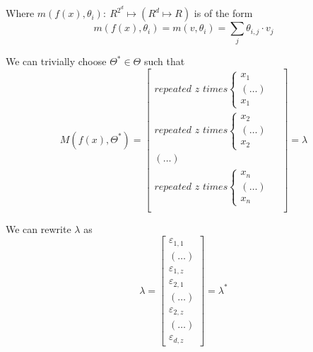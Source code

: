 \documentclass[11pt]{article}
\theoremstyle{definition}
\theoremstyle{definition}
\begin{document}
Where $m(f(x), \theta_i): \ R^{2^d} \mapsto (R^d \mapsto R)$ is of the form
\begin{equation}
    m(f(x), \theta_i)
    = 
    m(v, \theta_i)
    =
    \sum_j \theta_{i,j} \cdot v_j
\end{equation}

We can trivially choose $\Theta^* \in \Theta$ such that 
\begin{equation}
    M(f(x), \Theta^*)
    = 
    \begin{bmatrix}
        \textit{repeated $z$ times} 
        \begin{cases}
            x_1 &  \\
            (\dots) & \\
            x_1 & 
        \end{cases} \\
        \textit{repeated $z$ times} 

        \begin{cases}
            x_2 &  \\
            (\dots) & \\
            x_2 & 
        \end{cases} \\
        (\dots) \\
        \textit{repeated $z$ times} 
        \begin{cases}
            x_n &  \\
            (\dots) & \\
            x_n & 
        \end{cases} \\
    \end{bmatrix}
    = \lambda
\end{equation}

We can rewrite $\lambda$ as
\begin{equation} \label{star}
    \lambda 
    = 
    \begin{bmatrix}
        \varepsilon_{1, 1} \\
        (\dots) \\
        \varepsilon_{1, z} \\
        \varepsilon_{2, 1} \\
        (\dots) \\
        \varepsilon_{2, z} \\
        (\dots) \\
        \varepsilon_{d, z} 
    \end{bmatrix}
    = \lambda^*
\end{equation}
\end{document}
